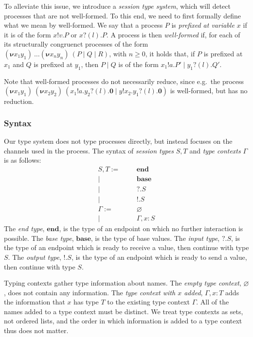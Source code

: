 \documentclass[a4paper]{article}
\newcommand{\Pend}{\bm{0}}
\newcommand{\Ppar}[2]{#1 \mid #2}
\newcommand{\Pout}[3]{#1 ! #2 . #3}
\newcommand{\Pin}[3]{#1 ? (#2) . #3}
\newcommand{\Presd}[3]{(\bm{\nu} #1#2)~#3}
\newcommand{\Tend}{\mathbf{end}}
\newcommand{\Tbase}{\mathbf{base}}
\newcommand{\Tin}[1]{{?}.#1}
\newcommand{\Tout}[1]{{!}.#1}
\newcommand{\hastype}[2]{#1 : #2}
\newcommand{\Cempty}{\varnothing}
\newcommand{\Cadd}[2]{#1, #2}
\begin{document}
To alleviate this issue, we introduce a \emph{session type system}, which will detect processes that are not well-formed.
To this end, we need to first formally define what we mean by well-formed.
We say that a process \( P \) is \emph{prefixed at variable \( x \)} if it is of the form \( \Pout{x}{v}{P} \) or \( \Pin{x}{l}{P} \).
A process is then \emph{well-formed} if, for each of its structurally congruenct processes of the form \( \Presd{x_1}{y_1}{\dots \Presd{x_n}{y_n}{(\Ppar{\Ppar{P}{Q}}{R})}} \), with \( n \geq 0 \), it holds that, if \( P \) is prefixed at \( x_1 \) and \( Q \) is prefixed at \( y_1 \), then \( \Ppar{P}{Q} \) is of the form \( \Ppar{\Pout{x_1}{a}{P'}}{\Pin{y_1}{l}{Q'}} \).

Note that well-formed processes do not necessarily reduce, since e.g.\ the process \( \Presd{x_1}{y_1}{\Presd{x_2}{y_2}{(\Ppar{\Pout{x_1}{a}{\Pin{y_2}{l}{\Pend}}}{\Pout{y}{x_2}{\Pin{y_1}{l}{\Pend}}})}} \) is well-formed, but has no reduction.

\subsubsection{Syntax}
Our type system does not type processes directly, but instead focuses on the channels used in the process.
The syntax of \emph{session types} \( S, T \) and \emph{type contexts} \( \Gamma \) is as follows:
\begin{align*}
  S,T := &&& \Tend \\
  |&&& \Tbase \\
  |&&& \Tin{S} \\
  |&&& \Tout{S} \\
  \Gamma := &&& \Cempty \\
  |&&& \Cadd{\Gamma}{\hastype{x}{S}}
\end{align*}
The \emph{end type}, \( \Tend \), is the type of an endpoint on which no further interaction is possible.
The \emph{base type}, \( \Tbase \), is the type of base values.
The \emph{input type}, \( \Tin{S} \), is the type of an endpoint which is ready to receive a value, then continue with type \( S \).
The \emph{output type}, \( \Tout{S} \), is the type of an endpoint which is ready to send a value, then continue with type \( S \).

Typing contexts gather type information about names.
The \emph{empty type context}, \( \Cempty \), does not contain any information.
The \emph{type context with \( x \) added}, \( \Cadd{\Gamma}{\hastype{x}{T}} \) adds the information that \( x \) has type \( T \) to the existing type context \( \Gamma \).
All of the names added to a type context must be distinct.
We treat type contexts as sets, not ordered lists, and the order in which information is added to a type context thus does not matter.
\end{document}
